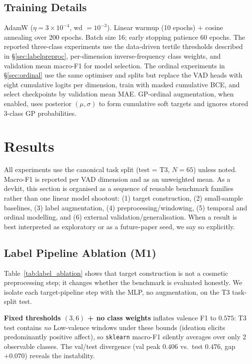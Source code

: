 \documentclass[sigconf,review,anonymous]{acmart}
\begin{document}
\subsection{Training Details}
AdamW ($\eta = 3{\times}10^{-4}$, wd $= 10^{-3}$).
Linear warmup (10 epochs) $+$ cosine annealing over 200 epochs.
Batch size 16; early stopping patience 60 epochs.
The reported three-class experiments use the data-driven tertile thresholds
described in \S\ref{sec:labelpreproc}, per-dimension inverse-frequency class
weights, and validation mean macro-F1 for model selection.
The ordinal experiments in \S\ref{sec:ordinal} use the same optimiser and
splits but replace the VAD heads with eight cumulative logits per dimension,
train with masked cumulative BCE, and select checkpoints by validation mean
MAE.  GP-ordinal augmentation, when enabled, uses posterior $(\mu,\sigma)$ to
form cumulative soft targets and ignores stored 3-class GP probabilities.

\section{Results}
\label{sec:results}

All experiments use the canonical task split (test = T3, $N = 65$) unless
noted. Macro-F1 is reported per VAD dimension and as an unweighted mean.
As a devkit, this section is organised as a sequence of reusable benchmark
families rather than one linear model shootout:
(1) target construction,
(2) small-sample baselines,
(3) label augmentation,
(4) preprocessing/windowing,
(5) temporal and ordinal modelling,
and (6) external validation/generalisation.
When a result is best interpreted as exploratory or as a future-paper seed,
we say so explicitly.

\subsection{Label Pipeline Ablation (M1)}
\label{sec:labelablation}

Table~\ref{tab:label_ablation} shows that target construction is not a cosmetic preprocessing
step; it changes whether the benchmark is evaluated honestly.
We isolate each target-pipeline step with the MLP, no augmentation, on the T3
task-split test.

\textbf{Fixed thresholds $(3, 6)$ + no class weights} inflates valence F1
to $0.575$: T3 test contains \emph{no} Low-valence windows under these
bounds (ideation elicits predominantly positive affect), so \texttt{sklearn}
macro-F1 silently averages over only 2 observable classes.
The val/test divergence (val peak $0.406$ vs.\ test $0.476$, gap $+0.070$)
reveals the instability.
\end{document}
